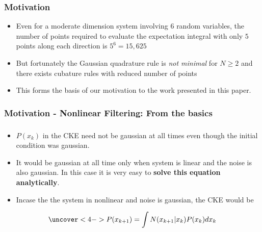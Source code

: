 \documentclass{beamer}
\begin{document}
\begin{frame}
\frametitle{Motivation}
\begin{itemize}[<+->]	
		\item Even for a moderate dimension system involving $6$ random variables, the number of points required to evaluate the expectation integral with only $5$ points along each direction is $5^6=15,625$
	\item But fortunately the Gaussian quadrature rule is \emph{not minimal} for $N\ge2$ and there exists cubature rules with reduced number of points
	\item This forms the basis of our motivation to the work presented in this paper.
	\end{itemize}
\end{frame}
\begin{frame}
\frametitle{Motivation - Nonlinear Filtering: From the basics }


\end{frame}
\begin{frame}
\frametitle{ }
\begin{itemize}[<+->]
	\item $P(x_k)$ in the CKE need not be gaussian at all times even though the initial condition was gaussian. 
	\item It would be gaussian at all time only when system is linear and the noise is also gaussian. In this case it is very easy to {\bf solve this equation analytically}.
	\item Incase the  the system in nonlinear and noise is gaussian, the CKE would be
\end{itemize}

	\begin{align*}
	\uncover<4->{P(x_{k+1})=\int{N(x_{k+1}|x_k)P(x_k)}dx_k}
	\end{align*}
\end{frame}
\end{document}

